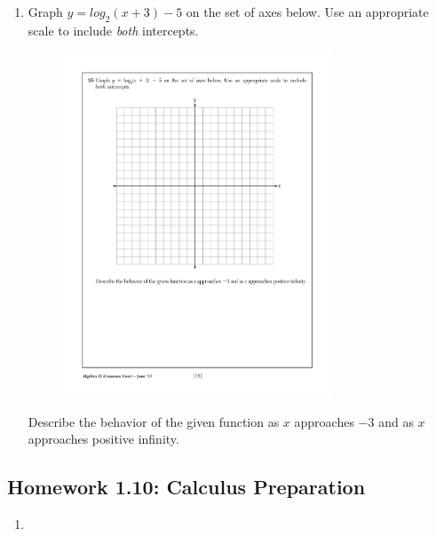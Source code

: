 \documentclass[12pt, oneside]{article}
\begin{document}
\begin{enumerate}
  \newpage %
  \item  %
  Graph $y=log_2{(x +3)} - 5$ on the set of axes below. Use an appropriate scale to include \textit{both} intercepts.
  \vspace{0.5 in}
  \begin{figure}[!ht]
      \centering
      \includegraphics[width=0.75\textwidth]{regents-grid.pdf}
  \end{figure}

  Describe the behavior of the given function as $x$ approaches $-3$ and as $x$ approaches positive infinity.
\end{enumerate}


\newpage
\subsection*{Homework 1.10: Calculus Preparation}
\begin{enumerate}
  \item
\end{enumerate}
\end{document}
